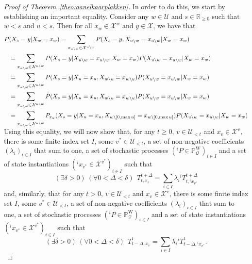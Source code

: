 \documentclass[10pt,a4paper]{paper}
\theoremstyle{definition}
\newcommand{\reals}{\mathbb{R}}
\newcommand{\states}{\mathcal{X}}
\newcommand{\processes}{\mathbb{P}}
\newcommand{\wprocesses}{\processes^{\mathrm{W}}}
\newcommand{\rateset}{\mathcal{Q}}
\begin{document}
\begin{proof}[Proof of Theorem~\ref{theo:aanelkaarplakken}]
In order to do this, we start by establishing an important equality.
Consider any $w\in\mathcal{U}$ and $s\in\reals_{\geq0}$ such that $w<s$ and $u<s$. Then for all $x_w\in\states^w$ and $y\in\states$, we have that
\begin{align}\label{eq:theo:aanelkaarplakken:convexcombo}
P&(X_s=y\vert X_w=x_w)
=
\sum_{x_{u\setminus w}\in\states^{u\setminus w}}
P(X_s=y,
X_{u\setminus w}=x_{u\setminus w}
\vert X_w=x_w)\notag\\
&=
\sum_{x_{u\setminus w}\in\states^{u\setminus w}}
P(X_s=y\vert
X_{u\setminus w}=x_{u\setminus w}, X_w=x_w)
P(X_{u\setminus w}=x_{u\setminus w}
\vert X_w=x_w)\notag\\
&=
\sum_{x_{u\setminus w}\in\states^{u\setminus w}}
P(X_s=y\vert
X_{u}=x_{u}, X_{w\setminus u}=x_{w\setminus u})
P(X_{u\setminus w}=x_{u\setminus w}
\vert X_w=x_w)\notag\\
&=
\sum_{x_{u\setminus w}\in\states^{u\setminus w}}
\tilde{P}(X_s=y\vert
X_{u}=x_{u}, X_{w\setminus u}=x_{w\setminus u})
P(X_{u\setminus w}=x_{u\setminus w}
\vert X_w=x_w)\notag\\
&=
\sum_{x_{u\setminus w}\in\states^{u\setminus w}}
P_{x_u}(X_s=y\vert
X_{u}=x_{u}, X_{w\setminus [0,\max u]}=x_{w\setminus [0,\max u]})
P(X_{u\setminus w}=x_{u\setminus w}
\vert X_w=x_w)\notag\\[-3mm]
\end{align}
Using this equality, we will now show that, for any $t\geq0$, $v\in\mathcal{U}_{<t}$ and $x_v\in\states^v$, there is some finite index set $I$, some $v^*\in\mathcal{U}_{<t}$, a set of non-negative coefficients $(\lambda_i)_{i\in I}$ that sum to one, a set of stochastic processes $({}^iP\in\wprocesses_\rateset)_{i\in I}$ and a set of state instantiations $({}^ix_{v^*}\in\states^{v^*})_{i\in I}$ such that
\begin{equation}\label{eq:theo:aanelkaarplakken:convexTright}
(\exists \delta>0)~(\forall 0<\Delta<\delta)~~
T_{t,x_v}^{t+\Delta}
=\sum_{i\in I}\lambda_i
{}^iT_{t,{}^ix_{v^*}}^{t+\Delta}
\end{equation}
and, similarly, that for any $t>0$, $v\in\mathcal{U}_{<t}$ and $x_v\in\states^v$, there is some finite index set $I$, some $v^*\in\mathcal{U}_{<t}$, a set of non-negative coefficients $(\lambda_i)_{i\in I}$ that sum to one, a set of stochastic processes $({}^iP\in\wprocesses_\rateset)_{i\in I}$ and a set of state instantiations $({}^ix_{v^*}\in\states^{v^*})_{i\in I}$ such that
\begin{equation}\label{eq:theo:aanelkaarplakken:convexTleft}
(\exists \delta>0)~(\forall 0<\Delta<\delta)~~
T_{t-\Delta,x_v}^{t}
=\sum_{i\in I}\lambda_i
{}^iT_{t-\Delta,{}^ix_{v^*}}^{t}.
\end{equation}


\end{proof}
\end{document}
